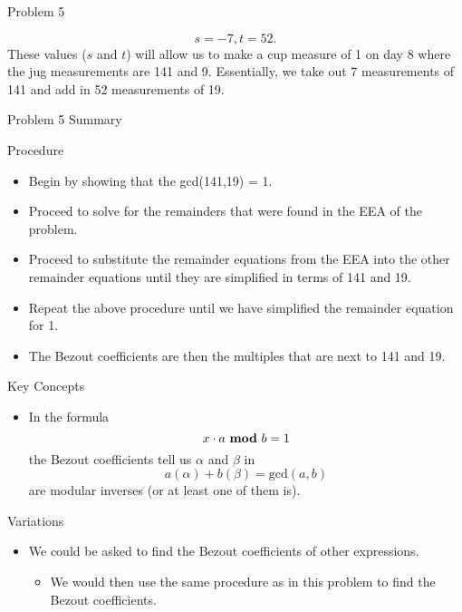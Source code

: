 \begin{problem}{Problem 5}
\begin{highlight}[Solution]
        \begin{equation}
            s = -7 , t = 52.
        \end{equation}
        These values ($s$ and $t$) will allow us to make a cup measure of 1 on day 8 where the jug measurements are 141 and 9. Essentially, we take out 7 measurements of 141 and add in 52 measurements
        of 19.
    \end{highlight}
\end{problem}

\begin{summary}{Problem 5 Summary}
    \begin{statement}{Procedure}
        \begin{itemize}
            \item Begin by showing that the gcd(141,19) = 1.
            \item Proceed to solve for the remainders that were found in the EEA of the problem.
            \item Proceed to substitute the remainder equations from the EEA into the other remainder equations until they are simplified in terms of 141 and 19.
            \item Repeat the above procedure until we have simplified the remainder equation for 1.
            \item The Bezout coefficients are then the multiples that are next to 141 and 19.
        \end{itemize}
    \end{statement}
    \begin{statement}{Key Concepts}
        \begin{itemize}
            \item In the formula
            \begin{equation*}
                x \cdot a \text{ \textbf{mod} } b = 1
            \end{equation*}
            the Bezout coefficients tell us $\alpha$ and $\beta$ in 
            \begin{equation*}
                a (\alpha) + b (\beta) = \text{gcd}(a,b)
            \end{equation*}
            are modular inverses (or at least one of them is). 
        \end{itemize}
    \end{statement}
    \begin{statement}{Variations}
        \begin{itemize}
            \item We could be asked to find the Bezout coefficients of other expressions.
            \begin{itemize}
                \item We would then use the same procedure as in this problem to find the Bezout coefficients.
            \end{itemize}
        \end{itemize}
    \end{statement}
\end{summary}

